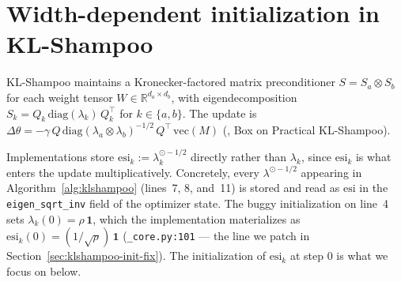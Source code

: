 %
%
\providecommand{\highlight}[1]{\textcolor{red}{#1}}   %
\providecommand{\R}{\mathbb{R}}                       %
\providecommand{\esi}{\mathrm{esi}}                   %
\providecommand{\coloneqq}{\mathrel{:=}}              %
\providecommand{\modif}[1]{\textcolor{blue}{#1}}      %

\section{Width-dependent initialization in KL-Shampoo}
\label{sec:klshampoo-init-bug}

KL-Shampoo \citep{lin2025klshampoo} maintains a Kronecker-factored matrix
preconditioner $S = S_a \otimes S_b$ for each weight tensor
$W\in\R^{d_a\times d_b}$, with eigendecomposition
$S_k = Q_k\,\mathrm{diag}(\lambda_k)\,Q_k^\top$ for $k\in\{a,b\}$. The update is
$\Delta\theta = -\gamma\,Q\,\mathrm{diag}(\lambda_a\otimes\lambda_b)^{-1/2}\,Q^\top\,\mathrm{vec}(M)$
(\citealp{lin2025klshampoo}, Box on Practical KL-Shampoo).

Implementations \citep{lin2025klshampoo,klshampoojax} store
$\esi_k \coloneqq \lambda_k^{\odot -1/2}$ directly rather than $\lambda_k$, since
$\esi_k$ is what enters the update multiplicatively. Concretely, every
$\lambda^{\odot -1/2}$ appearing in Algorithm~\ref{alg:klshampoo}
(lines~7, 8, and~11) is stored and read as $\esi$ in the
\texttt{eigen\_sqrt\_inv} field of the optimizer state. The buggy
initialization on line~4 sets $\lambda_k(0)=\rho\,\mathbf{1}$, which the
implementation materializes as $\esi_k(0) = (1/\sqrt{\rho})\,\mathbf{1}$
(\texttt{\_core.py:101} --- the line we patch in
Section~\ref{sec:klshampoo-init-fix}). The initialization of $\esi_k$ at
step $0$ is what we focus on below.

